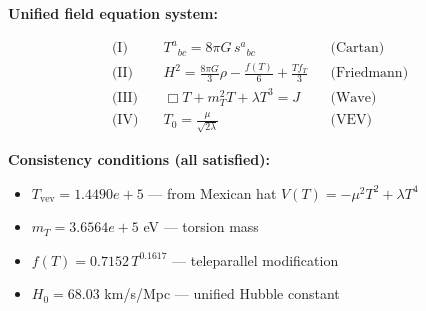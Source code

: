 
\textbf{Unified field equation system:}

\begin{align}
  \text{(I)} \quad & T^a{}_{bc} = 8\pi G \, s^a{}_{bc} && \text{(Cartan)} \\
  \text{(II)} \quad & H^2 = \frac{8\pi G}{3}\rho - \frac{f(T)}{6} + \frac{Tf_T}{3} && \text{(Friedmann)} \\
  \text{(III)} \quad & \Box T + m_T^2 T + \lambda T^3 = J && \text{(Wave)} \\
  \text{(IV)} \quad & T_0 = \frac{\mu}{\sqrt{2\lambda}} && \text{(VEV)}
\end{align}

\textbf{Consistency conditions (all satisfied):}
\begin{itemize}
  \item $T_{\text{vev}} = 1.4490e+5$ — from Mexican hat $V(T) = -\mu^2 T^2 + \lambda T^4$
  \item $m_T = 3.6564e+5$ eV — torsion mass
  \item $f(T) = 0.7152 \, T^{0.1617}$ — teleparallel modification
  \item $H_0 = 68.03$ km/s/Mpc — unified Hubble constant
\end{itemize}